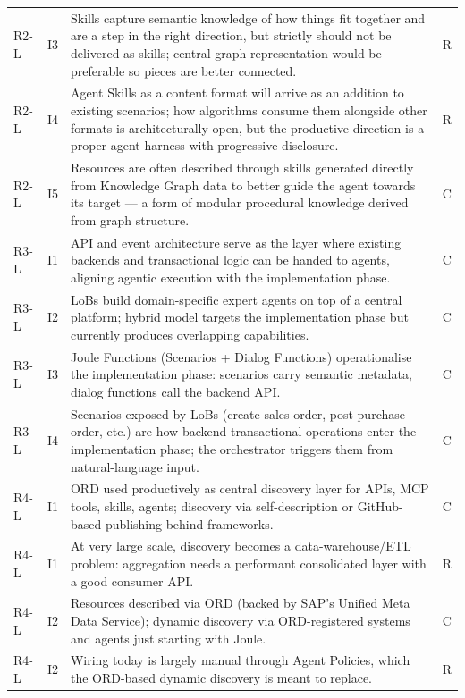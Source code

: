 \begin{longtable}{@{} p{0.9cm} p{0.7cm} p{13.8cm} p{0.7cm} @{}}
R2-L & I3 & Skills capture semantic knowledge of how things fit together and are a step in the right direction, but strictly should not be delivered as skills; central graph representation would be preferable so pieces are better connected. & R \\
R2-L & I4 & Agent Skills as a content format will arrive as an addition to existing scenarios; how algorithms consume them alongside other formats is architecturally open, but the productive direction is a proper agent harness with progressive disclosure. & R \\
R2-L & I5 & Resources are often described through skills generated directly from Knowledge Graph data to better guide the agent towards its target --- a form of modular procedural knowledge derived from graph structure. & C \\
\midrule
R3-L & I1 & API and event architecture serve as the layer where existing backends and transactional logic can be handed to agents, aligning agentic execution with the implementation phase. & C \\
R3-L & I2 & LoBs build domain-specific expert agents on top of a central platform; hybrid model targets the implementation phase but currently produces overlapping capabilities. & C \\
R3-L & I3 & Joule Functions (Scenarios + Dialog Functions) operationalise the implementation phase: scenarios carry semantic metadata, dialog functions call the backend API. & C \\
R3-L & I4 & Scenarios exposed by LoBs (create sales order, post purchase order, etc.) are how backend transactional operations enter the implementation phase; the orchestrator triggers them from natural-language input. & C \\
\midrule
R4-L & I1 & ORD used productively as central discovery layer for APIs, MCP tools, skills, agents; discovery via self-description or GitHub-based publishing behind frameworks. & C \\
R4-L & I1 & At very large scale, discovery becomes a data-warehouse/ETL problem: aggregation needs a performant consolidated layer with a good consumer API. & R \\
R4-L & I2 & Resources described via ORD (backed by SAP's Unified Meta Data Service); dynamic discovery via ORD-registered systems and agents just starting with Joule. & C \\
R4-L & I2 & Wiring today is largely manual through Agent Policies, which the ORD-based dynamic discovery is meant to replace. & R \\

\end{longtable}
